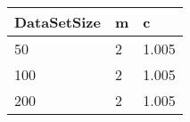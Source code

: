 \begin{tabular}{lll}
DataSetSize & m & c \\ 
\hline 
50 & 2 & 1.005 \\ 
100 & 2 & 1.005 \\ 
200 & 2 & 1.005 \\ 
\hline 
\end{tabular}